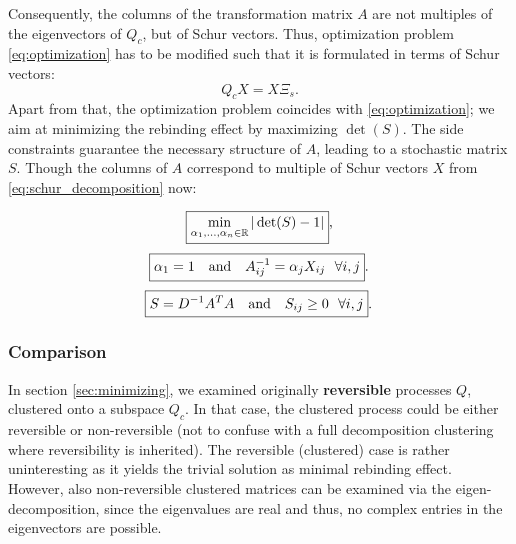 Consequently, the columns of the transformation matrix $A$ are not multiples of the eigenvectors of $Q_c$, but of Schur vectors.
Thus, optimization problem \eqref{eq:optimization} has to be modified such that it is formulated in terms of Schur vectors: %
\begin{equation}
	\label{eq:schur_decomposition}
	Q_c X = X \Xi_s.
\end{equation}
Apart from that, %
the optimization problem coincides with \eqref{eq:optimization}; we aim at minimizing the rebinding effect by maximizing $\det(S)$. The side constraints guarantee the necessary structure of $A$, leading to a stochastic matrix $S$. Though the columns of $A$ correspond to multiple of Schur vectors $X$ from \eqref{eq:schur_decomposition} now:

\begin{equation}
\mbox{
	\boxed{ \min_{\alpha_1, \dots, \alpha_n \in \mathbb{R}} |\det(S) -1|},
}
\end{equation}
\begin{equation*}
	\mbox{
		\boxed{ \alpha_1 = 1 \ \ \ \mathrm{and} \ \ \ A_{ij}^{-1} = \alpha_j X_{ij} \ \ \forall i,j}.
	}
\end{equation*}
\begin{equation*}
	\mbox{
		\boxed{S = D^{-1} A^TA \ \ \ \mathrm{and} \ \ \ S_{ij} \geq 0 \ \ \forall i,j}.
	}
\end{equation*}

\subsubsection*{Comparison}


In section \ref{sec:minimizing}, we examined originally \textbf{reversible} processes $Q$, clustered onto a subspace $Q_c$. In that case, the clustered process could be either reversible or non-reversible (not to confuse with a full decomposition clustering where reversibility is inherited).
The reversible (clustered) case is rather uninteresting as it yields the trivial solution as minimal rebinding effect. However, also non-reversible clustered matrices can be examined via the eigen-decomposition, since the eigenvalues are real and thus, no complex entries in the eigenvectors are possible.

